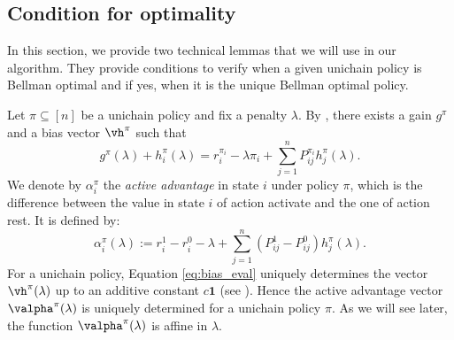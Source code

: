 \subsection{Condition for optimality}

In this section, we provide two technical lemmas that we will use in our algorithm. %
They provide conditions to verify when a given unichain policy is Bellman optimal and if yes, when it is the unique Bellman optimal policy. 

Let $\pi\subseteq[n]$ be a unichain policy and fix a penalty $\lambda$. By \cite[Chapter~8]{puterman2014markov}, there exists a gain $g^\pi$ and a bias vector $\vh^\pi$ such that
\begin{equation}
    g^\pi(\lambda) + h^\pi_i(\lambda) = r^{\pi_i}_i -\lambda \pi_i + \sum_{j=1}^n P^{\pi_i}_{ij}h^\pi_j(\lambda).  \label{eq:bias_eval}
\end{equation}
We denote by  $\alpha^{\pi}_i$  the \emph{active advantage} in state $i$ under policy $\pi$, which is the difference between the value in state $i$ of action activate and the one of action rest.
It is defined by:
\begin{equation}
    \label{eq:advantage}
    \alpha^\pi_i(\lambda):=r^1_i -r^0_i -\lambda +\sum_{j=1}^n (P^1_{ij} -P^0_{ij})h^\pi_j(\lambda).
\end{equation}
For a unichain policy, Equation \eqref{eq:bias_eval} uniquely determines the vector $\vh^\pi(\lambda)$ up to an additive constant $c\mathbf{1}$ (see \cite[Chapter 8]{puterman2014markov}). Hence the active advantage vector $\valpha^\pi(\lambda)$ is uniquely determined for a unichain policy $\pi$. As we will see later, the function $\valpha^\pi(\lambda)$ is affine in $\lambda$.

